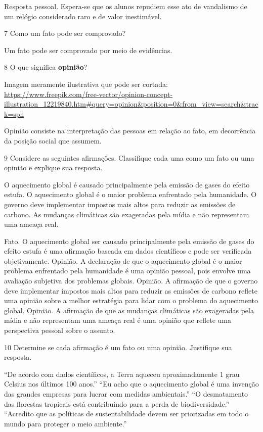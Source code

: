 \begin{itemize}
\begin{itemize}
{\begin{itemize}
\begin{itemize}

Resposta pessoal. Espera-se que os alunos repudiem esse ato de
vandalismo de um relógio considerado raro e de valor inestimável.

\num{7} Como um fato pode ser comprovado?


Um fato pode ser comprovado por meio de evidências.

\num{8} O que significa \textbf{opinião}?

Imagem meramente ilustrativa que pode ser cortada:
\url{https://www.freepik.com/free-vector/opinion-concept-illustration_12219840.htm\#query=opinion\&position=0\&from_view=search\&track=sph}


Opinião consiste na interpretação das pessoas em relação ao fato, em
decorrência da posição social que assumem.

\num{9} Considere as seguintes afirmações. Classifique cada uma como um
fato ou uma opinião e explique sua resposta.

O aquecimento global é causado principalmente pela emissão de gases do
efeito estufa. O aquecimento global é o maior problema enfrentado pela
humanidade. O governo deve implementar impostos mais altos para reduzir
as emissões de carbono. As mudanças climáticas são exageradas pela mídia
e não representam uma ameaça real.


Fato. O aquecimento global ser causado principalmente pela emissão de
gases do efeito estufa é uma afirmação baseada em dados científicos e
pode ser verificada objetivamente. Opinião. A declaração de que o
aquecimento global é o maior problema enfrentado pela humanidade é uma
opinião pessoal, pois envolve uma avaliação subjetiva dos problemas
globais. Opinião. A afirmação de que o governo deve implementar impostos
mais altos para reduzir as emissões de carbono reflete uma opinião sobre
a melhor estratégia para lidar com o problema do aquecimento global.
Opinião. A afirmação de que as mudanças climáticas são exageradas pela
mídia e não representam uma ameaça real é uma opinião que reflete uma
perspectiva pessoal sobre o assunto.

\num{10} Determine se cada afirmação é um fato ou uma opinião.
Justifique sua resposta.

``De acordo com dados científicos, a Terra aqueceu aproximadamente 1
grau Celsius nos últimos 100 anos.'' ``Eu acho que o aquecimento global
é uma invenção das grandes empresas para lucrar com medidas
ambientais.'' ``O desmatamento das florestas tropicais está contribuindo
para a perda de biodiversidade.'' ``Acredito que as políticas de
sustentabilidade devem ser priorizadas em todo o mundo para proteger o
meio ambiente.''


\end{itemize}
\end{itemize}}
\end{itemize}
\end{itemize}
